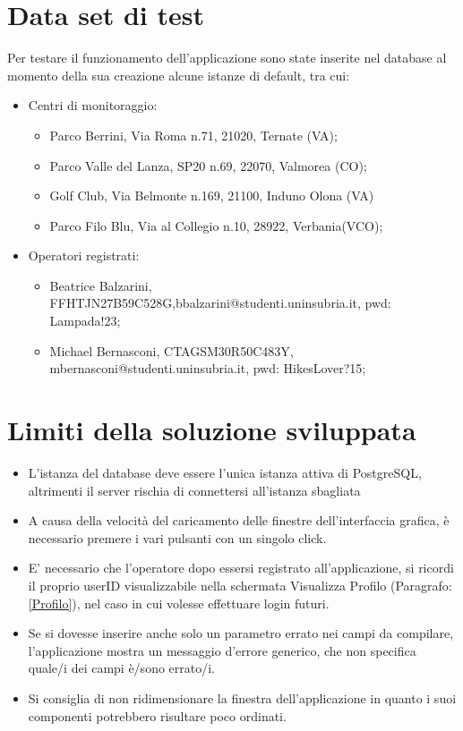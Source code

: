 \chapter{Data set di test}
Per testare il funzionamento dell'applicazione sono state inserite nel database al momento della sua creazione alcune istanze di default, tra cui:
\begin{itemize}
	\item Centri di monitoraggio:
	\begin{itemize}
		\item Parco Berrini, Via Roma n.71, 21020, Ternate (VA);
		\item Parco Valle del Lanza, SP20 n.69, 22070, Valmorea (CO);
		\item Golf Club, Via Belmonte n.169, 21100, Induno Olona (VA)
		\item Parco Filo Blu, Via al Collegio n.10,
		28922, Verbania(VCO);
	\end{itemize}
	\item Operatori registrati:
	\begin{itemize}
		\item Beatrice Balzarini, FFHTJN27B59C528G,bbalzarini@studenti.uninsubria.it, pwd: Lampada!23;
		\item Michael Bernasconi, CTAGSM30R50C483Y, mbernasconi@studenti.uninsubria.it, pwd: HikesLover?15;
	\end{itemize}
\end{itemize}



\chapter{Limiti della soluzione sviluppata}
\begin{itemize}
	\item L'istanza del database deve essere l'unica istanza attiva di PostgreSQL, altrimenti il server rischia di connettersi all'istanza sbagliata
	\item A causa della velocità del caricamento delle finestre dell'interfaccia grafica, è necessario premere i vari pulsanti con un singolo click.
	\item E' necessario che l'operatore dopo essersi registrato all'applicazione, si ricordi il proprio userID visualizzabile nella schermata Visualizza Profilo (Paragrafo:\ref{Profilo}), nel caso in cui volesse effettuare login futuri.  
	\item Se si dovesse inserire anche solo un parametro errato nei campi da compilare, l'applicazione mostra un messaggio d'errore generico, che non specifica quale/i dei campi è/sono errato/i.
	\item Si consiglia di non ridimensionare la finestra dell'applicazione in quanto i suoi componenti potrebbero risultare poco ordinati.
\end{itemize}

\nocite{IuriTex}


